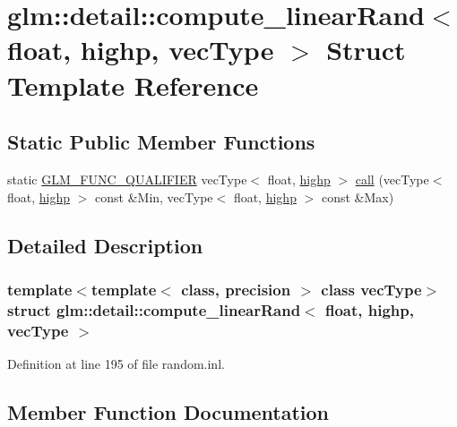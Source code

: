 \hypertarget{structglm_1_1detail_1_1compute__linear_rand_3_01float_00_01highp_00_01vec_type_01_4}{}\section{glm\+::detail\+::compute\+\_\+linear\+Rand$<$ float, highp, vec\+Type $>$ Struct Template Reference}
\label{structglm_1_1detail_1_1compute__linear_rand_3_01float_00_01highp_00_01vec_type_01_4}
\subsection*{Static Public Member Functions}
\begin{DoxyCompactItemize}
\item 
static \mbox{\hyperlink{setup_8hpp_a33fdea6f91c5f834105f7415e2a64407}{G\+L\+M\+\_\+\+F\+U\+N\+C\+\_\+\+Q\+U\+A\+L\+I\+F\+I\+ER}} vec\+Type$<$ float, \mbox{\hyperlink{namespaceglm_a0f04f086094c747d227af4425893f545ac6f7eab42eacbb10d59a58e95e362074}{highp}} $>$ \mbox{\hyperlink{structglm_1_1detail_1_1compute__linear_rand_3_01float_00_01highp_00_01vec_type_01_4_a1ac79c6d4365ce29a99e45327d51ec47}{call}} (vec\+Type$<$ float, \mbox{\hyperlink{namespaceglm_a0f04f086094c747d227af4425893f545ac6f7eab42eacbb10d59a58e95e362074}{highp}} $>$ const \&Min, vec\+Type$<$ float, \mbox{\hyperlink{namespaceglm_a0f04f086094c747d227af4425893f545ac6f7eab42eacbb10d59a58e95e362074}{highp}} $>$ const \&Max)
\end{DoxyCompactItemize}


\subsection{Detailed Description}
\subsubsection*{template$<$template$<$ class, precision $>$ class vec\+Type$>$\newline
struct glm\+::detail\+::compute\+\_\+linear\+Rand$<$ float, highp, vec\+Type $>$}



Definition at line 195 of file random.\+inl.



\subsection{Member Function Documentation}
\mbox{\label{structglm_1_1detail_1_1compute__linear_rand_3_01float_00_01highp_00_01vec_type_01_4_a1ac79c6d4365ce29a99e45327d51ec47}} 
